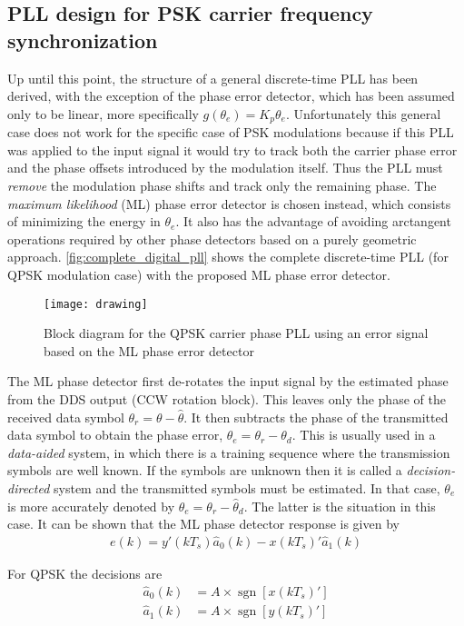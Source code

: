 \subsection{PLL design for PSK carrier frequency synchronization}
Up until this point, the structure of a general discrete-time PLL has been derived, with the exception of the phase error detector, which has been assumed only to be linear, more specifically $g(\theta_e)=K_p\theta_e$. Unfortunately this general case does not work for the specific case of PSK modulations because if this PLL was applied to the input signal it would try to track both the carrier phase error and the phase offsets introduced by the modulation itself. Thus the PLL must \emph{remove} the modulation phase shifts and track only the remaining phase. The \emph{maximum likelihood} (ML) phase error detector is chosen instead, which consists of minimizing the energy in $\theta_e$. It also has the advantage of avoiding arctangent operations required by other phase detectors based on a purely geometric approach. \autoref{fig:complete_digital_pll} shows the complete discrete-time PLL (for QPSK modulation case) with the proposed ML phase error detector.
\begin{figure}[ht]
  \centering
  \texttt{[image: drawing]}
  \caption{Block diagram for the QPSK carrier phase PLL using an error signal based on the ML phase error detector}
  \label{fig:complete_digital_pll}
\end{figure}
The ML phase detector first de-rotates the input signal by the estimated phase from the DDS output (CCW rotation block). This leaves only the phase of the received data symbol $\theta_r = \theta-\hat\theta$. It then subtracts the phase of the transmitted data symbol to obtain the phase error, $\theta_e=\theta_r-\theta_d$. This is usually used in a \emph{data-aided} system, in which there is a training sequence where the transmission symbols are well known. If the symbols are unknown then it is called a \emph{decision-directed} system and the transmitted symbols must be estimated. In that case, $\theta_e$ is more accurately denoted by $\theta_e=\theta_r-\hat\theta_d$. The latter is the situation in this case. It can be shown \cite{digcomm_discrete_approach} that the ML phase detector response is given by
\begin{align}
  e(k)=y'(kT_s)\hat a_0(k)-x(kT_s)'\hat a_1(k)
\end{align}

For QPSK the decisions are
\begin{align}
\hat a_0(k) &= A\times\operatorname{sgn}\left[x(kT_s)'\right] \\
\hat a_1(k) &= A\times\operatorname{sgn}\left[y(kT_s)'\right]
\end{align}

